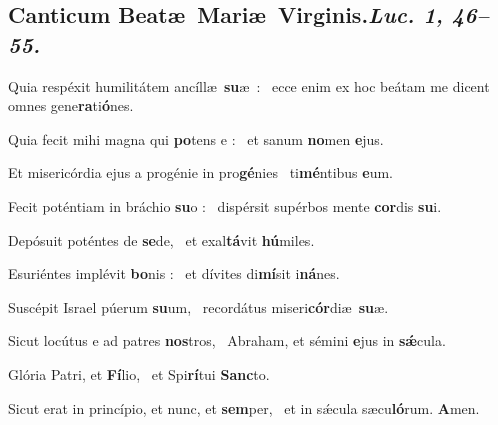 \documentclass[12pt]{article} %
\newenvironment{psalmtext}{\leftskip 0.25in}{\vspace{1 mm}}
\let\oldgresixstar\gresixstar
\renewcommand{\gresixstar}{\textcolor{benred8}{\oldgresixstar}}
\def\capitulumSpace{\hspace{20 mm}}
\begin{document}
\subsection*{}

\subsection*{Canticum Beat\ae\ Mari\ae\ Virginis.\capitulumSpace \emph{Luc. 1, 46--55.}}


\gresetfirstlineaboveinitial{\small \textsc{ \textbf{\textcolor{benred8}{V a}}}}{\small \textsc{ \textbf{\textcolor{benred8}{V a}}}}

\begin{psalmtext}
Quia resp\'{e}xit humilit\'{a}tem anc\'{i}ll\ae\ \textbf{su}\ae\ : \gresixstar\ ecce enim ex hoc be\'{a}tam me dicent omnes gene\textbf{ra}ti\textbf{\'{o}}nes.

Quia fecit mihi magna qui \textbf{po}tens e : \gresixstar\ et sanum \textbf{no}men \textbf{e}jus.

Et miseric\'{o}rdia ejus a prog\'{e}nie in pro\textbf{g\'{e}}nies \gresixstar\ ti\textbf{m\'{e}}ntibus \textbf{e}um.

Fecit pot\'{e}ntiam in br\'{a}chio \textbf{su}o : \gresixstar\ disp\'{e}rsit sup\'{e}rbos mente \textbf{cor}dis \textbf{su}i.

Dep\'{o}suit pot\'{e}ntes de \textbf{se}de, \gresixstar\ et exal\textbf{t\'{a}}vit \textbf{h\'{u}}miles.

Esuri\'{e}ntes impl\'{e}vit \textbf{bo}nis : \gresixstar\ et d\'{i}vites di\textbf{m\'{i}}sit i\textbf{n\'{a}}nes.

Susc\'{e}pit Israel p\'{u}erum \textbf{su}um, \gresixstar\ record\'{a}tus miseri\textbf{c\'{o}r}di\ae\ \textbf{su}\ae.

Sicut loc\'{u}tus e ad patres \textbf{nos}tros, \gresixstar\ Abraham, et s\'{e}mini \textbf{e}jus in \textbf{s\'{\ae}}cula.

Glória Patri, et \textbf{Fí}lio, \gresixstar\ et Spi\textbf{rí}tui \textbf{Sanc}to.

Sicut erat in princípio, et nunc, et \textbf{sem}per, \gresixstar\ et in sǽcula sæcu\textbf{ló}rum. \textbf{A}men.

\end{psalmtext}
\end{document}
